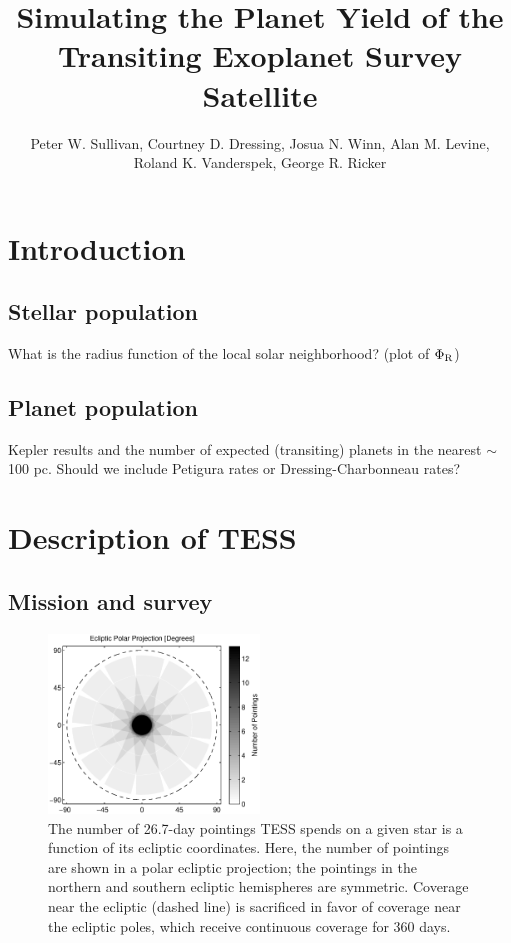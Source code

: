 \documentclass[preprint]{aastex}
\def \phir {\Phi_{\rm R}}
\begin{document}
\title{Simulating the Planet Yield of the Transiting Exoplanet Survey Satellite}

\author{Peter W. Sullivan, Courtney D. Dressing, Josua N. Winn, Alan M. Levine, Roland K. Vanderspek, George R. Ricker}



\section{Introduction}
\subsection{Stellar population}
What is the radius function of the local solar neighborhood? (plot of $\phir$)
\subsection{Planet population}
Kepler results and the number of expected (transiting) planets in the nearest $\sim$100 pc. Should we include Petigura rates or Dressing-Charbonneau rates?

\section{Description of TESS}
\subsection{Mission and survey}

\begin{figure}[hbtp]
\begin{center}
\includegraphics[width=0.5\textwidth]{npnt.eps}
\caption{The number of 26.7-day pointings TESS spends on a given star is a function of its ecliptic coordinates. Here, the number of pointings are shown in a polar ecliptic projection; the pointings in the northern and southern ecliptic hemispheres are symmetric. Coverage near the ecliptic (dashed line) is sacrificed in favor of coverage near the ecliptic poles, which receive continuous coverage for 360 days.}
\end{center}
\end{figure}
\end{document}
